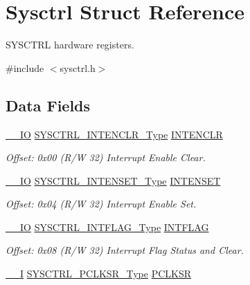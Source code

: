 \hypertarget{struct_sysctrl}{}\section{Sysctrl Struct Reference}
\label{struct_sysctrl}


S\+Y\+S\+C\+T\+RL hardware registers.  




{\ttfamily \#include $<$sysctrl.\+h$>$}

\subsection*{Data Fields}
\begin{DoxyCompactItemize}
\item 
\mbox{\hyperlink{core__cm0plus_8h_aec43007d9998a0a0e01faede4133d6be}{\+\_\+\+\_\+\+IO}} \mbox{\hyperlink{union_s_y_s_c_t_r_l___i_n_t_e_n_c_l_r___type}{S\+Y\+S\+C\+T\+R\+L\+\_\+\+I\+N\+T\+E\+N\+C\+L\+R\+\_\+\+Type}} \mbox{\hyperlink{struct_sysctrl_a1d808a00eac38e52b0109553dc0f6146}{I\+N\+T\+E\+N\+C\+LR}}
\begin{DoxyCompactList}\small\item\em Offset\+: 0x00 (R/W 32) Interrupt Enable Clear. \end{DoxyCompactList}\item 
\mbox{\hyperlink{core__cm0plus_8h_aec43007d9998a0a0e01faede4133d6be}{\+\_\+\+\_\+\+IO}} \mbox{\hyperlink{union_s_y_s_c_t_r_l___i_n_t_e_n_s_e_t___type}{S\+Y\+S\+C\+T\+R\+L\+\_\+\+I\+N\+T\+E\+N\+S\+E\+T\+\_\+\+Type}} \mbox{\hyperlink{struct_sysctrl_aa6b27c37a7c7adbbd42c718eb0f6754b}{I\+N\+T\+E\+N\+S\+ET}}
\begin{DoxyCompactList}\small\item\em Offset\+: 0x04 (R/W 32) Interrupt Enable Set. \end{DoxyCompactList}\item 
\mbox{\hyperlink{core__cm0plus_8h_aec43007d9998a0a0e01faede4133d6be}{\+\_\+\+\_\+\+IO}} \mbox{\hyperlink{union_s_y_s_c_t_r_l___i_n_t_f_l_a_g___type}{S\+Y\+S\+C\+T\+R\+L\+\_\+\+I\+N\+T\+F\+L\+A\+G\+\_\+\+Type}} \mbox{\hyperlink{struct_sysctrl_a325bea42d801793b8a4d7bee7f450a2d}{I\+N\+T\+F\+L\+AG}}
\begin{DoxyCompactList}\small\item\em Offset\+: 0x08 (R/W 32) Interrupt Flag Status and Clear. \end{DoxyCompactList}\item 
\mbox{\hyperlink{core__cm0plus_8h_af63697ed9952cc71e1225efe205f6cd3}{\+\_\+\+\_\+I}} \mbox{\hyperlink{union_s_y_s_c_t_r_l___p_c_l_k_s_r___type}{S\+Y\+S\+C\+T\+R\+L\+\_\+\+P\+C\+L\+K\+S\+R\+\_\+\+Type}} \mbox{\hyperlink{struct_sysctrl_a4842dba7be30bf1892fe34b23a609181}{P\+C\+L\+K\+SR}}

\end{DoxyCompactItemize}

